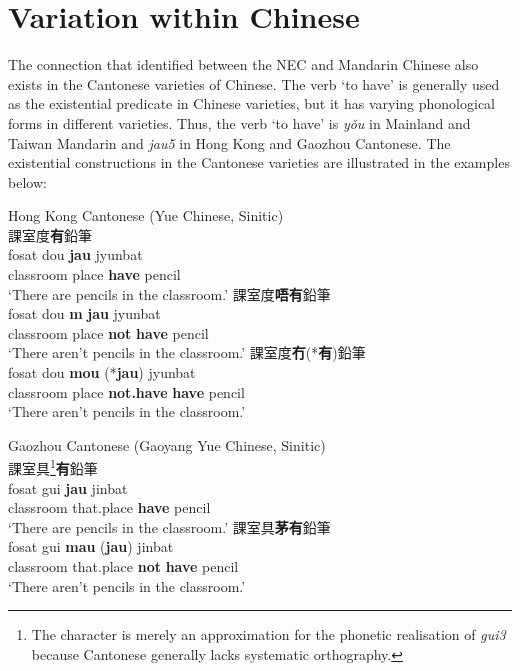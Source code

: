 \documentclass[output=paper]{langscibook}
\begin{document}
\section{Variation within Chinese}\label{s:lam5}

The connection that \citeauthor{Croft1991} identified between the NEC and Mandarin Chinese also exists in the Cantonese varieties of Chinese. The verb `to have' is generally used as the existential predicate in Chinese varieties, but it has varying phonological forms in different varieties. Thus, the verb `to have' is \textit{yǒu} in Mainland and Taiwan Mandarin and \textit{jau5} in Hong Kong and Gaozhou Cantonese. The existential constructions in the Cantonese varieties are illustrated in the examples below: 


\ea Hong Kong Cantonese (Yue Chinese, Sinitic) \label{ex:lam27}\\
  \ea 課室度\textbf{有}鉛筆 \label{ex:lam27a}\\
  	\gll fosat	dou	\textbf{jau} jyunbat\\
  	classroom place	\textbf{have} pencil\\
  	\glt `There are pencils in the classroom.'
  \ex 課室度\textbf{唔有}鉛筆 \label{ex:lam27b}\\
  	\gll *fosat	dou	\textbf{m} \textbf{jau} jyunbat\\
  	classroom place	\textbf{not} \textbf{have} pencil\\
  	\glt `There aren't pencils in the classroom.'
  \ex 課室度\textbf{冇}(*\textbf{有})鉛筆 \label{ex:lam27c}\\
  	\gll fosat	dou	\textbf{mou} (*\textbf{jau}) jyunbat\\
  	classroom	place	\textbf{not.have}	\textbf{have}	pencil\\
  	\glt `There aren't pencils in the classroom.'
\z \z
 
\ea Gaozhou Cantonese (Gaoyang Yue Chinese, Sinitic) \label{ex:lam28}\\
  \ea 課室具\footnote{The character is merely an approximation for the phonetic realisation of \textit{gui3} because Cantonese generally lacks systematic orthography.}\textbf{有}鉛筆 \label{ex:lam28a}\\
  	\gll fosat gui \textbf{jau} jinbat\\	
  	classroom that.place \textbf{have} pencil\\
  	\glt `There are pencils in the classroom.'
  \ex 課室具\textbf{茅有}鉛筆 \label{ex:lam28b}\\
  	\gll fosat gui \textbf{mau} (\textbf{jau}) jinbat\\
  	classroom that.place \textbf{not} \textbf{have} pencil\\
  	\glt `There aren't pencils in the classroom.'
\z \z
\end{document}

